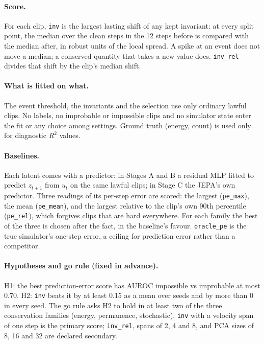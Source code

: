 \documentclass[11pt]{article}
\begin{document}
\paragraph{Score.} For each clip, \texttt{inv} is the largest lasting shift of any kept invariant:
at every split point, the median over the clean steps in the 12 steps before is compared with the
median after, in robust units of the local spread. A spike at an event does not move a median; a
conserved quantity that takes a new value does. \texttt{inv\_rel} divides that shift by the clip's
median shift.

\paragraph{What is fitted on what.} The event threshold, the invariants and the selection use only
ordinary lawful clips. No labels, no improbable or impossible clips and no simulator state enter
the fit or any choice among settings. Ground truth (energy, count) is used only for diagnostic
$R^2$ values.

\paragraph{Baselines.} Each latent comes with a predictor: in Stages A and B a residual MLP fitted to
predict $z_{t+1}$ from $u_t$ on the same lawful clips; in Stage C the JEPA's own predictor. Three
readings of its per-step error are scored: the largest (\texttt{pe\_max}), the mean
(\texttt{pe\_mean}), and the largest relative to the clip's own 90th percentile (\texttt{pe\_rel}),
which forgives clips that are hard everywhere. For each family the best of the three is chosen after
the fact, in the baseline's favour. \texttt{oracle\_pe} is the true simulator's one-step error, a
ceiling for prediction error rather than a competitor.

\paragraph{Hypotheses and go rule (fixed in advance).} H1: the best prediction-error score has AUROC
impossible vs improbable at most 0.70. H2: \texttt{inv} beats it by at least 0.15 as a mean over
seeds and by more than 0 in every seed. The go rule asks H2 to hold in at least two of the three
conservation families (energy, permanence, stochastic). \texttt{inv} with a velocity span of one
step is the primary score; \texttt{inv\_rel}, spans of 2, 4 and 8, and PCA sizes of 8, 16 and 32 are
declared secondary.
\end{document}
